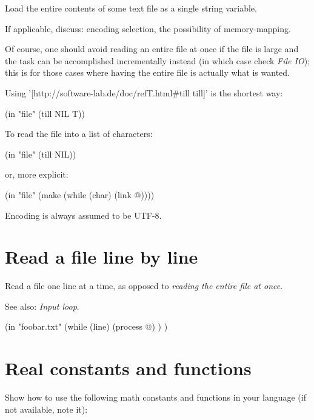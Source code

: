 Load the entire contents of some text file as a single string variable.

If applicable, discuss: encoding selection, the possibility of
memory-mapping.

Of course, one should avoid reading an entire file at once if the file
is large and the task can be accomplished incrementally instead (in
which case check \emph{File IO}); this is for those
cases where having the entire file is actually what is wanted.


\begin{wideverbatim}

Using '[http://software-lab.de/doc/refT.html#till till]' is the shortest way:

   (in "file" (till NIL T))

To read the file into a list of characters:

   (in "file" (till NIL))

or, more explicit:

   (in "file" (make (while (char) (link @))))

Encoding is always assumed to be UTF-8.

\end{wideverbatim}

\pagebreak{}
\section*{Read a file line by line}


Read a file one line at a time, as opposed to
\emph{reading the entire file at once}.

See also: \emph{Input loop}.



\begin{wideverbatim}

(in "foobar.txt"
   (while (line)
      (process @) ) )

\end{wideverbatim}

\pagebreak{}
\section*{Real constants and functions}

Show how to use the following math constants and functions in your
language (if not available, note it):

